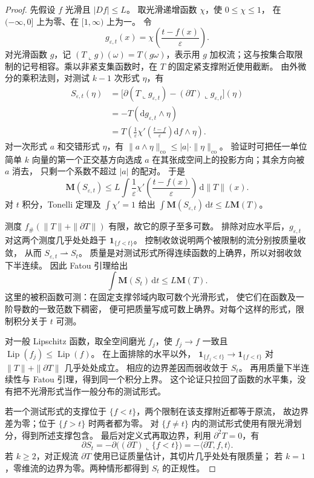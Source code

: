 \begin{proof}
先假设 \(f\) 光滑且 \(|Df|\leq L\)。
取光滑递增函数 \(\chi\)，使 \(0\leq\chi\leq1\)，
在 \((-\infty,0]\) 上为零、在 \([1,\infty)\) 上为一。
令
\[
 g_{\varepsilon,t}(x)
       =\chi\!\left(\frac{t-f(x)}{\varepsilon}\right).
\]
对光滑函数 \(g\)，记 \((T\llcorner g)(\omega)=T(g\omega)\)，表示用 \(g\) 加权流；这与按集合取限制的记号相容。乘以非紧支集函数时，在 \(T\) 的固定紧支撑附近使用截断。
由外微分的乘积法则，对测试 \(k-1\) 次形式 \(\eta\)，有
\[
 \begin{split}
 S_{\varepsilon,t}(\eta)
 &=\bigl[\partial(T\llcorner g_{\varepsilon,t})
               -(\partial T)\llcorner g_{\varepsilon,t}\bigr](\eta)\\
 &=-T(\mathrm{d}g_{\varepsilon,t}\wedge\eta)\\
 &=T\!\left(\frac1\varepsilon
       \chi'\!\left(\frac{t-f}{\varepsilon}\right)\mathrm{d}f\wedge\eta\right).
 \end{split}
\]
对一次形式 \(a\) 和交错形式 \(\eta\)，有
\(\|a\wedge\eta\|_{\mathrm{co}}\leq |a|\cdot\|\eta\|_{\mathrm{co}}\)。
验证时可把任一单位简单 \(k\) 向量的第一个正交基方向选成
\(a\) 在其张成空间上的投影方向；其余方向被 \(a\) 消去，
只剩一个系数不超过 \(|a|\) 的配对。
于是
\[
 \mathbf M(S_{\varepsilon,t})
 \leq L\int\frac1\varepsilon
           \chi'\!\left(\frac{t-f(x)}{\varepsilon}\right)\,\mathrm{d}\|T\|(x).
\]
对 \(t\) 积分，Tonelli 定理及 \(\int\chi'=1\) 给出
\(\int\mathbf M(S_{\varepsilon,t})\,\mathrm{d}t\leq L\mathbf M(T)\)。

测度 \(f_\#(\|T\|+\|\partial T\|)\) 有限，故它的原子至多可数。
排除对应水平后，\(g_{\varepsilon,t}\) 对这两个测度几乎处处趋于
\(\mathbf1_{\{f<t\}}\)。
控制收敛说明两个被限制的流分别按质量收敛，
从而 \(S_{\varepsilon,t}\rightharpoonup S_t\)。
质量是对测试形式所得连续函数的上确界，所以对弱收敛下半连续。
因此 Fatou 引理给出
\[
 \int\mathbf M(S_t)\,\mathrm{d}t\leq L\mathbf M(T).
\]
这里的被积函数可测：在固定支撑邻域内取可数个光滑形式，
使它们在函数及一阶导数的一致范数下稠密，
便可把质量写成可数上确界。对每个这样的形式，限制积分关于 \(t\) 可测。

对一般 Lipschitz 函数，取全空间磨光 \(f_j\)，使 \(f_j\rightarrow f\) 一致且
\(\operatorname{Lip}(f_j)\leq\operatorname{Lip}(f)\)。
在上面排除的水平以外，
\(\mathbf1_{\{f_j<t\}}\rightarrow\mathbf1_{\{f<t\}}\)
对 \(\|T\|+\|\partial T\|\) 几乎处处成立。
相应的边界差因而弱收敛于 \(S_t\)。
再用质量下半连续性与 Fatou 引理，得到同一个积分上界。
这个论证只拉回了函数的水平集，没有把不光滑形式当作一般分布的测试形式。

若一个测试形式的支撑位于 \(\{f<t\}\)，两个限制在该支撑附近都等于原流，
故边界差为零；位于 \(\{f>t\}\) 时两者都为零。
对 \(\{f\neq t\}\) 内的测试形式使用有限光滑划分，得到所述支撑包含。
最后对定义式再取边界，利用 \(\partial^2T=0\)，有
\[
 \partial S_t=-\partial\bigl((\partial T)\llcorner\{f<t\}\bigr)
             =-\langle\partial T,f,t\rangle.
\]
若 \(k\geq2\)，对正规流 \(\partial T\) 使用已证质量估计，其切片几乎处处有限质量；
若 \(k=1\)，零维流的边界为零。两种情形都得到 \(S_t\) 的正规性。
\end{proof}

